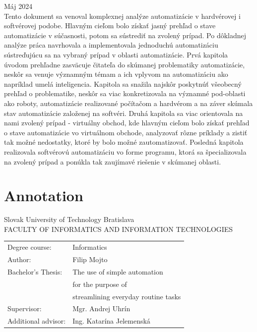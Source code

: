 \documentclass[twoside,slovak, a4paper]{article}
\newcommand\blankpage{
    \null
    \thispagestyle{empty}
    \addtocounter{page}{1}
    \newpage}
\begin{document}
\noindent
Máj 2024\\[2em]

\noindent
Tento dokument sa venoval komplexnej analýze automatizácie v hardvérovej i softvérovej podobe. Hlavným cieľom bolo získať jasný prehľad o stave automatizácie v súčasnosti, potom sa sústrediť na zvolený prípad. Po dôkladnej analýze práca navrhovala a implementovala jednoduchú automatizáciu sústreďujúcu sa na vybraný prípad v oblasti automatizácie. Prvá kapitola úvodom prehľadne zasväcuje čitateľa do skúmanej problematiky automatizácie, neskôr sa venuje významným témam a ich vplyvom na automatizáciu ako napríklad umelá inteligencia. Kapitola sa snažila najskôr poskytnúť všeobecný prehľad o problematike, neskôr sa viac konkretizovala na významné pod-oblasti ako roboty, automatizácie realizované počítačom a hardvérom a na záver skúmala stav automatizácie založenej na softvéri. Druhá kapitola sa viac orientovala na nami zvolený prípad - virtuálny obchod, kde hlavným cieľom bolo získať prehľad o stave automatizácie vo virtuálnom obchode, analyzovať rôzne príklady a zistiť tak možné nedostatky, ktoré by bolo možné zautomatizovať. Posledná kapitola realizovala softvérovú automatizáciu vo forme programu, ktorá sa špecializovala na zvolený prípad a ponúkla tak zaujímavé riešenie v skúmanej oblasti.


\blankpage

\blankpage


\section*{Annotation}

\vspace*{0.3cm}

Slovak University of Technology Bratislava\\

\noindent
FACULTY OF INFORMATICS AND INFORMATION TECHNOLOGIES\\[0.2em]

\noindent
\begin{tabular}{@{}ll}
Degree course: \hspace{11em} & Informatics \\[3em]
Author: \hspace{11em} & Filip Mojto \\[0.7em]
Bachelor's Thesis: \hspace{11em} & The use of simple automation \\
 \hspace{11em} & for the purpose of \\
 \hspace{11em} & streamlining everyday routine tasks\\[0.7em]
Supervisor: \hspace{11em} & Mgr. Andrej Uhrín\\[0.7em]
Additional advisor: \hspace{11em} & Ing. Katarína Jelemenská\\[1.7em]
\end{tabular}
\end{document}

